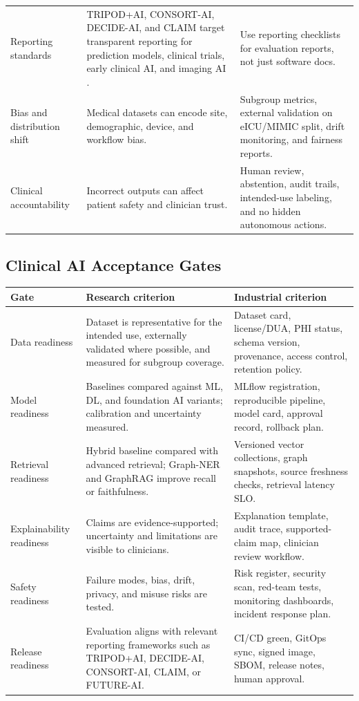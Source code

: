 \begin{longtable}{p{}p{}p{}}
\addlinespace
Reporting standards & TRIPOD+AI, CONSORT-AI, DECIDE-AI, and CLAIM target transparent reporting for prediction models, clinical trials, early clinical AI, and imaging AI \cite{tripodAI,consortAI,vasey2022decide,claimAI}. & Use reporting checklists for evaluation reports, not just software docs. \\
\addlinespace
Bias and distribution shift & Medical datasets can encode site, demographic, device, and workflow bias. & Subgroup metrics, external validation on eICU/MIMIC split, drift monitoring, and fairness reports. \\
\addlinespace
Clinical accountability & Incorrect outputs can affect patient safety and clinician trust. & Human review, abstention, audit trails, intended-use labeling, and no hidden autonomous actions. \\
\bottomrule
\end{longtable}

\subsection{Clinical AI Acceptance Gates}

\begin{longtable}{p{}p{}p{}}
\toprule
\textbf{Gate} & \textbf{Research criterion} & \textbf{Industrial criterion} \\
\midrule
Data readiness & Dataset is representative for the intended use, externally validated where possible, and measured for subgroup coverage. & Dataset card, license/DUA, PHI status, schema version, provenance, access control, retention policy. \\
\addlinespace
Model readiness & Baselines compared against ML, DL, and foundation AI variants; calibration and uncertainty measured. & MLflow registration, reproducible pipeline, model card, approval record, rollback plan. \\
\addlinespace
Retrieval readiness & Hybrid baseline compared with advanced retrieval; Graph-NER and GraphRAG improve recall or faithfulness. & Versioned vector collections, graph snapshots, source freshness checks, retrieval latency SLO. \\
\addlinespace
Explainability readiness & Claims are evidence-supported; uncertainty and limitations are visible to clinicians. & Explanation template, audit trace, supported-claim map, clinician review workflow. \\
\addlinespace
Safety readiness & Failure modes, bias, drift, privacy, and misuse risks are tested. & Risk register, security scan, red-team tests, monitoring dashboards, incident response plan. \\
\addlinespace
Release readiness & Evaluation aligns with relevant reporting frameworks such as TRIPOD+AI, DECIDE-AI, CONSORT-AI, CLAIM, or FUTURE-AI. & CI/CD green, GitOps sync, signed image, SBOM, release notes, human approval. \\
\bottomrule
\end{longtable}

